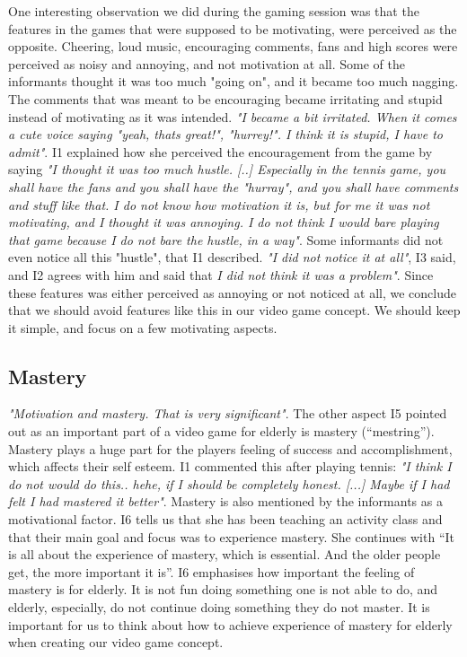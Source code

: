 One interesting observation we did during the gaming session was that the features in the games that were supposed to be motivating, were perceived as the opposite. Cheering, loud music, encouraging comments, fans and high scores were perceived as noisy and annoying, and not motivation at all. Some of the informants thought it was too much "going on", and it became too much nagging. The comments that was meant to be encouraging became irritating and stupid instead of motivating as it was intended. \emph{"I became a bit irritated. When it comes a cute voice saying "yeah, thats great!", "hurrey!". I think it is stupid, I have to admit"}.  I1 explained how she perceived the encouragement from the game by saying \emph{"I thought it was too much hustle. [..] Especially in the tennis game, you shall have the fans and you shall have the "hurray", and you shall have comments and stuff like that. I do not know how motivation it is, but for me it was not motivating, and I thought it was annoying. I do not think I would bare playing that game because I do not bare the hustle, in a way"}. Some informants did not even notice all this "hustle", that I1 described. \emph{"I did not notice it at all"}, I3 said, and I2 agrees with him and said that \emph{I did not think it was a problem"}. Since these features was either perceived as annoying or not noticed at all, we conclude that we should avoid features like this in our video game concept. We should keep it simple, and focus on a few motivating aspects. 

\subsection{Mastery}
\emph{"Motivation and mastery. That is very significant"}. The other aspect I5 pointed out as an important part of a video game for elderly is mastery (“mestring”). Mastery plays a huge part for the players feeling of success and accomplishment, which affects their self esteem. I1 commented this after playing tennis: \emph{"I think I do not would do this.. hehe, if I should be completely honest. [...] Maybe if I had felt I had mastered it better"}. Mastery is also mentioned by the informants as a motivational factor. I6 tells us that she has been teaching an activity class and that their main goal and focus was to experience mastery. She continues with “It is all about the experience of mastery, which is essential. And the older people get, the more important it is”. I6 emphasises how important the feeling of mastery is for elderly. It is not fun doing something one is not able to do, and elderly, especially, do not continue doing something they do not master. It is important for us to think about how to achieve experience of mastery for elderly when creating our video game concept. 

